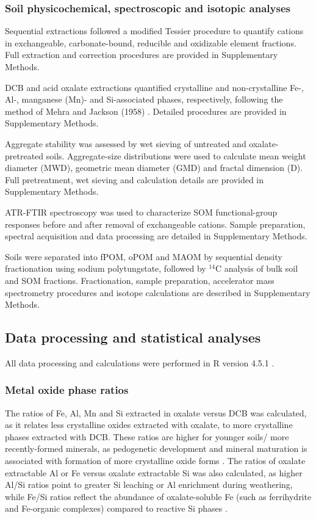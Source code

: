 \documentclass[preprint,12pt]{elsarticle}
\begin{document}
\subsubsection{Soil physicochemical, spectroscopic and isotopic analyses}
Sequential extractions followed a modified Tessier procedure \citep{Tessier1979} to quantify cations in exchangeable, carbonate-bound, reducible and oxidizable element fractions. Full extraction and correction procedures are provided in Supplementary Methods.

DCB and acid oxalate extractions quantified crystalline and non-crystalline Fe-, Al-, manganese (Mn)- and Si-associated phases, respectively, following the method of Mehra and Jackson (1958) \citep{Mehra1958}. Detailed procedures are provided in Supplementary Methods.

Aggregate stability was assessed by wet sieving of untreated and oxalate-pretreated soils. Aggregate-size distributions were used to calculate mean weight diameter (MWD), geometric mean diameter (GMD) and fractal dimension (D). Full pretreatment, wet sieving and calculation details are provided in Supplementary Methods.

ATR-FTIR spectroscopy was used to characterize SOM functional-group responses before and after removal of exchangeable cations. Sample preparation, spectral acquisition and data processing are detailed in Supplementary Methods.

Soils were separated into fPOM, oPOM and MAOM by sequential density fractionation using sodium polytungstate, followed by $^{14}$C analysis of bulk soil and SOM fractions. Fractionation, sample preparation, accelerator mass spectrometry procedures and isotope calculations are described in Supplementary Methods.

\subsection{Data processing and statistical analyses}
\label{subsec:statistics}
All data processing and calculations were performed in R version 4.5.1 \citep{RCoreTeam2025}.
  
\subsubsection{Metal oxide phase ratios}
The ratios of Fe, Al, Mn and Si extracted in oxalate versus DCB was calculated, as it relates less crystalline oxides extracted with oxalate, to more crystalline phases extracted with DCB. These ratios are higher for younger soils/ more recently-formed minerals, as pedogenetic development and mineral maturation is associated with formation of more crystalline oxide forms \citep{maier2025parent}. The ratios of oxalate extractable Al or Fe versus oxalate extractable Si was also calculated, as higher Al/Si ratios point to greater Si leaching or Al enrichment during weathering, while Fe/Si ratios reflect the abundance of oxalate-soluble Fe (such as ferrihydrite and Fe-organic complexes) compared to reactive Si phases \citep{Parfitt1988}. 
\end{document}
